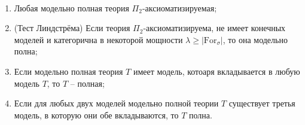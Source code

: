 \begin{prop} \ 

    \begin{enumerate}
        \item Любая модельно полная теория $\Pi_2$-аксиоматизируемая;
        \item (Тест Линдстрёма) Если теория $\Pi_2$-аксиоматизируема, не имеет конечных моделей и категорична в некоторой мощности $\lambda \geq |\text{For}_\sigma|$, то она модельно полна; 
        \item Если модельно полная теория $T$ имеет модель, котоаря вкладывается в любую модель $T$, то $T$ -- полная; 
        \item Если для любых двух моделей модельно полной теории $T$ существует третья модель, в которую они обе вкладываются, то $T$ полна.  
    \end{enumerate}
\end{prop}

